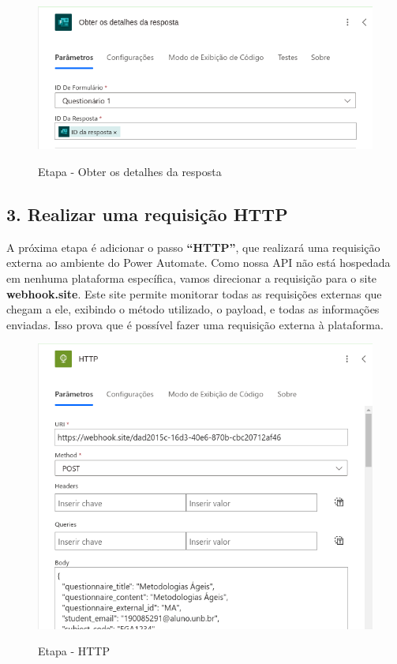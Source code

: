 \begin{figure}[H]
    \centering
    \caption{Etapa - Obter os detalhes da resposta}
    \includegraphics[width=1\textwidth]{figuras/mpa_detail_answer.png}
    \label{fig:report_questions}
\end{figure}

\subsection*{3. Realizar uma requisição HTTP}

A próxima etapa é adicionar o passo \textbf{``HTTP''}, que realizará uma requisição externa ao ambiente do Power Automate.
Como nossa API não está hospedada em nenhuma plataforma específica, vamos direcionar a requisição para o site \textbf{webhook.site}.
Este site permite monitorar todas as requisições externas que chegam a ele, exibindo o método utilizado, o payload, e todas as informações enviadas. Isso prova que é possível fazer uma requisição externa à plataforma.

\begin{figure}[H]
    \centering
    \caption{Etapa - HTTP}
    \includegraphics[width=1\textwidth]{figuras/mpa_http.png}
    \label{fig:report_questions}
\end{figure}

